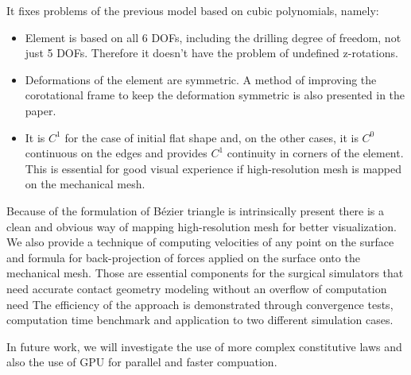 \documentclass{egpubl}
\begin{document}
It fixes problems of the previous model \cite{Comas2010c} based on cubic polynomials, namely:

\begin{itemize}

    \item Element is based on all 6 DOFs, including the drilling degree of
        freedom, not just 5 DOFs. Therefore it doesn't have the problem of
        undefined z-rotations.

    \item Deformations of the element are symmetric. A method of improving
    the corotational frame to keep the deformation symmetric is also
    presented in the paper.

    \item It is $C^1$ for the case of initial flat shape and, on the other cases, it is $C^0$ continuous on the edges and provides $C^1$ continuity in
    corners of the element. This is essential for good visual experience if
    high-resolution mesh is mapped on the mechanical mesh.

\end{itemize}

Because of the formulation of B\'ezier triangle is intrinsically present
there is a clean and obvious way of mapping high-resolution mesh for better
visualization. We also provide a technique of computing velocities of any point
on the surface and formula for back-projection of forces applied on the
surface onto the mechanical mesh. 
Those are essential components for the surgical simulators that need accurate contact geometry modeling without an overflow of computation need
The efficiency of the approach is demonstrated through convergence tests,  computation time benchmark and application to two different  simulation cases.

In future work, we will investigate the use of more complex constitutive laws and also the use of GPU for parallel and faster compuation.



%



\end{document}

